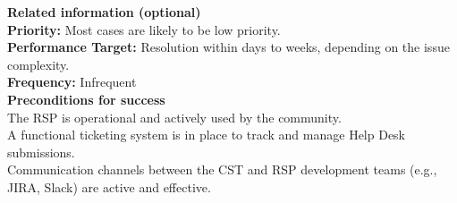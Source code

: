 \textbf{Related information (optional)} \\
\textbf{Priority:} Most cases are likely to be low priority. \\
\textbf{Performance Target:} Resolution within days to weeks, depending on the issue complexity. \\
\textbf{Frequency:} Infrequent \\

\textbf{Preconditions for success} \\
The RSP is operational and actively used by the community. \\
A functional ticketing system is in place to track and manage Help Desk submissions. \\
Communication channels between the CST and RSP development teams (e.g., JIRA, Slack) are active and effective. \\
